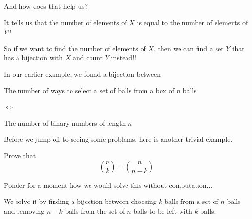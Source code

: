 \documentclass[compress]{beamer}
\begin{document}
\begin{frame}
    And how does that help us?\pause

    \vspace{1em}

    \begin{center}
        \begin{minipage}{.8\linewidth}
            It tells us that the number of elements of $X$ is equal to the number of
            elements of $Y$!!
        \end{minipage}
    \end{center}

    \pause\vspace{1em}

    So if we want to find the number of elements of $X$, then we can
    find a set $Y$ that has a bijection with $X$ and count $Y$ instead!!

    \pause\vspace{1em}

    In our earlier example, we found a bijection between 
    \vspace{1em}

    \begin{center}
        \begin{minipage}{.45\linewidth}
            The number of ways to select a set of balls from a box of $n$ balls
        \end{minipage}\hfill\hspace{.01\linewidth}
        \begin{minipage}{.04\linewidth}
            $\Leftrightarrow$
        \end{minipage}\hfill%
        \begin{minipage}{.45\linewidth}
            The number of binary numbers of length $n$ 
        \end{minipage}
    \end{center}

\end{frame}

\begin{frame}
    Before we jump off to seeing some problems, here is another trivial
    example. \pause
    \vspace{1em}

    Prove that \[{n \choose k} = {n \choose n-k}\] 

    \pause\vspace{1em}

    Ponder for a moment how we would solve this without computation...

    \pause\vspace{1em}

    We solve it by finding a bijection between \textcolor{NordBlue}{choosing
        $k$ balls from a set of $n$ balls} and \textcolor{NordBlue}{removing
        $n-k$ balls from the set of $n$ balls to be left with $k$ balls}.
\end{frame}
\end{document}
